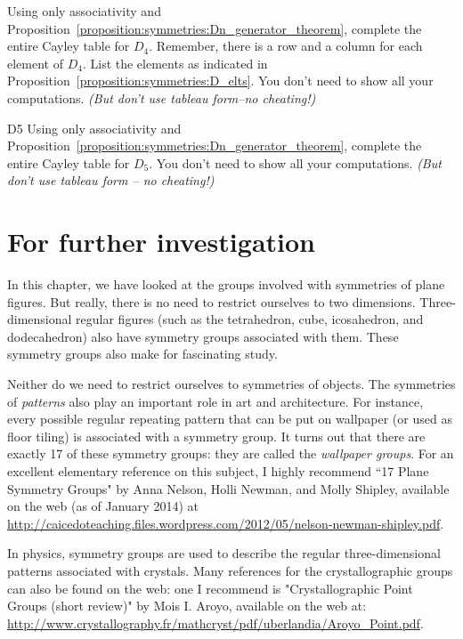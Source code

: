  \begin{exercise}{44}
Using only associativity and Proposition~\ref{proposition:symmetries:Dn_generator_theorem}, complete the entire Cayley table for $D_4$.  Remember, there is a row and a column for each element of $D_4$. List the elements as indicated in Proposition~\ref{proposition:symmetries:D_elts}. You don't need to show all your computations. \emph{(But don't use tableau form--no cheating!)} 
\end{exercise}

 \begin{exercise}{D5}
Using only associativity and Proposition~\ref{proposition:symmetries:Dn_generator_theorem}, complete the entire Cayley table for $D_5$.  You don't need to show all your computations. \emph{(But don't use tableau form -- no cheating!)} 
\end{exercise}

\section{For further investigation}
In this chapter, we have looked at the groups involved with symmetries of plane figures. But really, there is no need to restrict ourselves to two dimensions. Three-dimensional regular figures (such as the tetrahedron, cube, icosahedron, and dodecahedron) also have symmetry groups associated with them. These symmetry groups also make for fascinating study.

Neither do we need to restrict ourselves to symmetries of objects. The symmetries of \emph{patterns} also play an important role in art and architecture.  For instance, every possible regular repeating pattern that can be put on wallpaper (or used as floor tiling) is associated with a symmetry group. It turns out that there are exactly 17 of these symmetry groups: they are called the \emph{wallpaper groups}. For an excellent elementary reference on this subject, I highly recommend ``17 Plane Symmetry Groups" by Anna Nelson, Holli Newman, and Molly Shipley, available on the web (as of January 2014) at \url{http://caicedoteaching.files.wordpress.com/2012/05/nelson-newman-shipley.pdf}. 

In physics, symmetry groups are used to describe the regular three-dimensional patterns associated with crystals. Many references for the crystallographic groups can also be found on the web: one I recommend is "Crystallographic Point Groups (short review)" by Mois I. Aroyo, available on the web at: \url{http://www.crystallography.fr/mathcryst/pdf/uberlandia/Aroyo_Point.pdf}.



